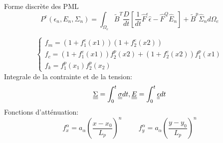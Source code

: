 \begin{frame}{Forme discrète des PML}
\begin{equation*}
P^e(\epsilon_n, E_n, \Sigma_n) = \int_{\Omega_e} \tilde{B}^T \frac{D}{dt} \left[\frac{1}{dt}\hat{F}^{\epsilon} \hat{\epsilon} - \hat{F}^Q \hat{E}_n \right] + \tilde{B}^p \hat{\Sigma}_n d\Omega_e
\end{equation*}

\begin{equation*}
\begin{cases}
f_m = (1+f^e_1(x1))(1+f^e_2(x2))\\
f_c = (1+f^e_1(x1))f^p_2(x2) + (1+f^e_2(x2))f^p_1(x1)\\
f_k = f^p_1(x_1)f^p_2(x_2)
\end{cases}
\end{equation*}
Integrale de la contrainte et de la tension:
\begin{equation*}
\underline{\underline{\Sigma}} = \int^t_0 \underline{\underline{\sigma}} dt, \underline{\underline{E}} = \int^t_0 \underline{\underline{\epsilon}} dt
\end{equation*}
Fonctions d'atténuation:
\begin{equation*}
f^\alpha_x = a_\alpha\left(\frac{x - x_0}{L_p} \right)^n \hspace{1cm} f^\alpha_y = a_\alpha\left(\frac{y - y_0}{L_p} \right)^n
\end{equation*}
\end{frame}


